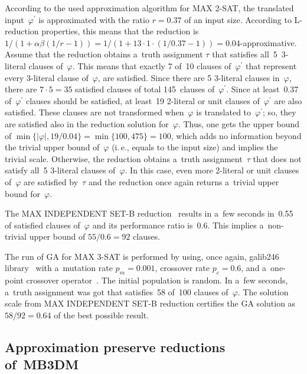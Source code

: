 \begin{multicols}{2}
According to the used approximation algorithm for {MAX 2-SAT},
the translated input~$\varphi^\prime$ is approximated with the ratio
$r=0.37$ of an input size. According to L-reduction properties, this
means that the reduction is $1/(1+\alpha\beta(1/r-1)) =
1/(1+13\cdot1\cdot(1/0.37-1)) = 0.04$-approximative. Assume that the
reduction obtains a~truth assignment $\tau$ that satisfies all~5\
3-literal clauses of~$\varphi$. This means that exactly 7 of~10
clauses of~$\varphi^\prime$ that represent every 3-literal clause
of~$\varphi$, are satisfied. Since there are 5 3-literal clauses in~$\varphi$,
there are $7\cdot5 = 35$ satisfied clauses of total
145~clauses of~$\varphi^\prime$. Since at least~0.37 of~$\varphi^\prime$
clauses should be satisfied, at least~19 2-literal or unit clauses
of~$\varphi^\prime$ are also satisfied. These clauses are not
transformed when~$\varphi$ is translated to~$\varphi^\prime$; so, they
are satisfied also in the reduction solution for~$\varphi$. Thus, one
gets the upper bound of $\min\{|\varphi|,19/0.04\} = \min\{100,475\} =
100$, which adds no information beyond the trivial upper bound
of~$\varphi$ (i.\,e., equals to the input size) and implies the trivial
scale. Otherwise, the reduction obtains a~truth assignment~$\tau$
that does not satisfy all~5 3-literal clauses of~$\varphi$. In this
case, even more 2-literal or unit clauses of~$\varphi$ are satisfied
by~$\tau$ and the reduction once again returns a~trivial upper
bound for~$\varphi$.

The {MAX INDEPENDENT SET-B} reduction~\cite{link-to-the-sofware-cite}
results in a~few seconds in~0.55
of satisfied clauses of~$\varphi$ and its performance ratio is~0.6.
This implies a~non-trivial upper bound of $55/0.6=92$
clauses.

The run of {GA} for {MAX 3-SAT} is performed by using, once
again, galib246 library~\cite{GAlib} with a~mutation rate $p_{m} =
0.001$, crossover rate $p_{c} = 0.6$, and a~one-point crossover
operator~\cite{link-to-the-sofware-cite}. The initial population is
random. In a~few seconds, a~truth assignment was got that satisfies~58
of~100 clauses of~$\varphi$. The solution scale from {MAX
INDEPENDENT SET-B} reduction certifies the {GA} solution as
$58/92=0.64$ of the best possible result.

\vspace*{-6pt}

\subsection{Approximation preserve reductions of~MB3DM}


\end{multicols}
